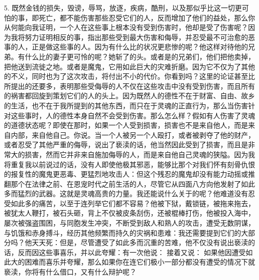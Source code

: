 5. 既然金钱的损失，毁谤，辱骂，放逐，疾病，酷刑，以及那似乎比这一切更可怕的事，即死亡，都不能伤害那些忍受它们的人，反而增加了他们的益处，那么你从何能向我证明，一个人在这些事上根本没有受到伤害时，他却是受了伤害呢？因为我将努力证明相反的事，指出那些受到最大伤害和侮辱，并忍受最不可治愈的恶事的人，正是做这些事的人。因为有什么比的状况更悲惨的呢？他这样对待他的兄弟。有什么比的妻子更可怜的呢？她斩了的头。或者是的兄弟们，他们把他卖掉，把他送到流徙之地。或者是魔鬼，它用如此巨大的灾难折磨。因为它不仅为了其他的不义，同时也为了这次攻击，将付出不小的代价。你看到吗？这里的论证甚至比所提出的还要多，表明那些受侮辱的人不仅在这些攻击中没有受到伤害，而且所有的祸害都回旋到策划它们的人的头上。因为既然人的德性不在于财富、自由、故乡的生活，也不在于我所提到的其他东西，而只在于灵魂的正直行为，那么当伤害针对这些事时，人的德性本身自然不会受到伤害。那么怎么样？假如有人伤害了灵魂的道德状态呢？即使在那时，如果一个人受到损害，损害也不是来自他人，而是来自内部，来自他自己。你说。当一个人被另一个人殴打，或者被剥夺了他的财产，或者忍受了其他严重的侮辱，说出了亵渎的话，他当然因此受到了损害，而且是非常大的损害，然而它并非来自施加侮辱的人，而是来自他自己灵魂的狭隘。因为我将重复我以前说过的话，没有人即使他极其邪恶，能够比那个对我们怀有刻骨仇恨的报复性的魔鬼更恶毒、更猛烈地攻击人：但这个残忍的魔鬼却没有能力动摇或推翻那个在法律之前、在恩宠时代之前生活的人，尽管它从四面八方向他发射了如此多而猛烈的武器。这就是灵魂高贵的力量。我还能说什么关于的呢？他难道没有忍受如此多的痛苦，以至于连列举它们都不容易？他被下狱，戴锁链，被拖来拖去，被犹太人鞭打，被石头砸，背上不仅被皮条刮伤，还被棍棒打伤，他被投入海中，屡次被强盗围困，与同胞发生冲突，不断受到敌人和熟人的攻击，遭受无数阴谋，与饥饿和赤身搏斗，经历其他频繁而持久的灾祸和患难：我还需要提到它们的大部分吗？他天天死：但是，尽管遭受了如此多而沉重的苦难，他不仅没有说出亵渎的话，反而因这些事喜乐，并以此夸耀：有一次他说： 接着又说： 如果他因遭受如此大的困难而喜乐并夸耀，那么如果你在连它们极小一部分都没有遭受的情况下就亵渎，你将有什么借口，又有什么辩护呢？\par

